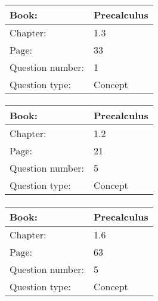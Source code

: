 \documentclass{article}
\begin{document}
            \paragraph{}
            \begin{tabularx}{1\textwidth}{
                    p{}
                    p{}
                }
                \toprule
                Book: & Precalculus
                \\
                \midrule
                Chapter: & 1.3
                \\
                \midrule
                Page: & 33
                \\
                \midrule
                Question number: & 1
                \\
                \midrule
                Question type: & Concept
                \\
                \bottomrule
            \end{tabularx}
            
            \paragraph{}
            \begin{tabularx}{1\textwidth}{
                    p{}
                    p{}
                }
                \toprule
                Book: & Precalculus
                \\
                \midrule
                Chapter: & 1.2
                \\
                \midrule
                Page: & 21
                \\
                \midrule
                Question number: & 5
                \\
                \midrule
                Question type: & Concept
                \\
                \bottomrule
            \end{tabularx}
            
            \paragraph{}
            \begin{tabularx}{1\textwidth}{
                    p{}
                    p{}
                }
                \toprule
                Book: & Precalculus
                \\
                \midrule
                Chapter: & 1.6
                \\
                \midrule
                Page: & 63
                \\
                \midrule
                Question number: & 5
                \\
                \midrule
                Question type: & Concept
                \\
                \bottomrule
            \end{tabularx}
            
\end{document}
